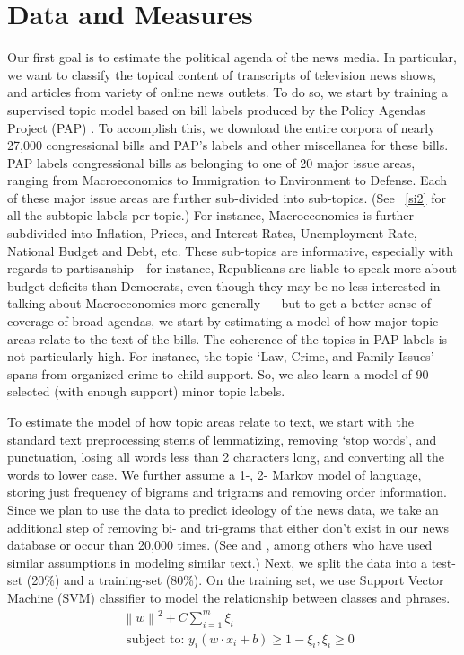 \documentclass[12pt, letterpaper]{article}
\begin{document}
\section*{Data and Measures}

Our first goal is to estimate the political agenda of the news media. In particular, we want to classify the topical content of transcripts of television news shows, and articles from variety of online news outlets. To do so, we start by training a supervised topic model based on bill labels produced by the Policy Agendas Project (PAP) \citep{baumgartner2003policy}. To accomplish this, we download the entire corpora of nearly 27,000 congressional bills and PAP's labels and other miscellanea for these bills. PAP labels congressional bills as belonging to one of 20 major issue areas, ranging from Macroeconomics to Immigration to Environment to Defense. Each of these major issue areas are further sub-divided into sub-topics. (See ~\ref{si2} for all the subtopic labels per topic.) For instance, Macroeconomics is further subdivided into Inflation, Prices, and Interest Rates, Unemployment Rate, National Budget and Debt, etc. These sub-topics are informative, especially with regards to partisanship---for instance, Republicans are liable to speak more about budget deficits than Democrats, even though they may be no less interested in talking about Macroeconomics more generally --- but to get a better sense of coverage of broad agendas, we start by estimating a model of how major topic areas relate to the text of the bills. The coherence of the topics in PAP labels is not particularly high. For instance, the topic `Law, Crime, and Family Issues' spans from organized crime to child support.  So, we also learn a model of 90 selected (with enough support) minor topic labels.

To estimate the model of how topic areas relate to text, we start with the standard text preprocessing stems of lemmatizing, removing `stop words', and punctuation, losing all words less than 2 characters long, and converting all the words to lower case. We further assume a 1-, 2- Markov model of language, storing just frequency of bigrams and trigrams and removing order information. Since we plan to use the data to predict ideology of the news data, we take an additional step of removing bi- and tri-grams that either don't exist in our news database or occur than 20,000 times. (See \citet{gentzkow2010} and \citet{MartinYurukoglu2014}, among others who have used similar assumptions in modeling similar text.) Next, we split the data into a test-set (20\%) and a training-set (80\%). On the training set, we use Support Vector Machine (SVM) classifier \citep{guyon2002gene} to model the relationship between classes and phrases. 
\begin{align*} 
& \left\lVert w \right\rVert^2 + C\sum_{i=1}^{m} \xi_i\\
& \text{   subject to: } y_i(w \cdot x_i + b) \ge 1 - \xi_i, \xi_i \ge 0
\end{align*}
\end{document}
